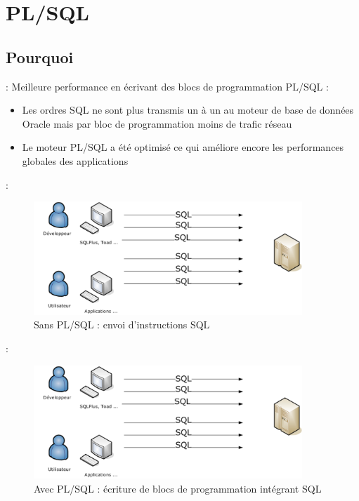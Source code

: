 \documentclass[10pt]{beamer}
\begin{document}
\section{PL/SQL}
\subsection{Pourquoi}

\begin{frame}{\secname : \subsecname}
    Meilleure performance en écrivant des blocs de programmation PL/SQL :
    \begin{itemize}
        \item Les ordres SQL ne sont plus transmis un à un au moteur de base de données Oracle mais par bloc de programmation        moins de trafic réseau
        \item Le moteur PL/SQL a été optimisé ce qui améliore encore les performances globales des applications
    \end{itemize}
\end{frame}

\begin{frame}{\secname : \subsecname}
    \begin{figure}
        \begin{center}
            \includegraphics[width=0.9\textwidth]{../assets/img/envoi_instruction.png}
            \caption{Sans PL/SQL : envoi d'instructions SQL}
        \end{center}
    \end{figure}
\end{frame}

\begin{frame}{\secname : \subsecname}
    \begin{figure}
        \begin{center}
            \includegraphics[width=0.9\textwidth]{../assets/img/envoi_instruction.png}
            \caption{Avec PL/SQL : écriture de blocs de programmation intégrant SQL}
        \end{center}
    \end{figure}
\end{frame}
\end{document}
